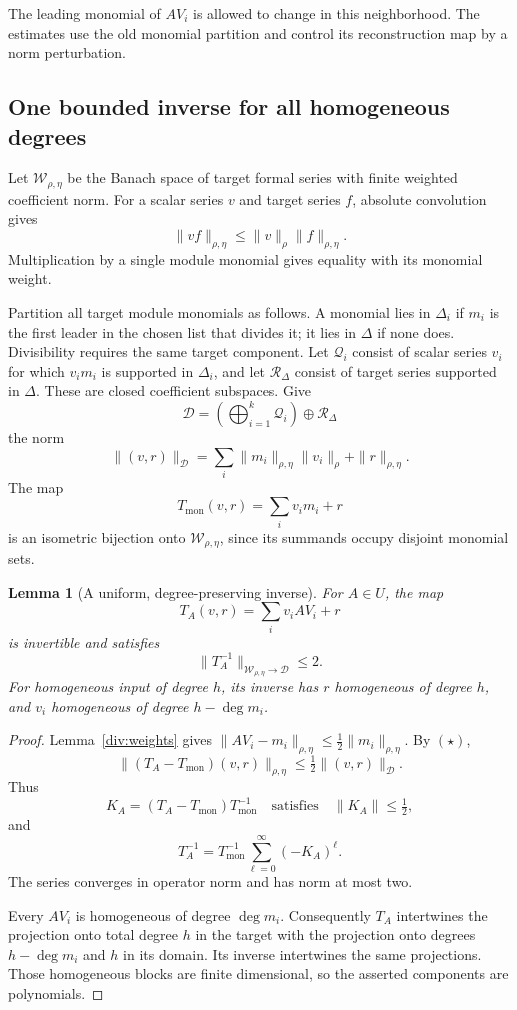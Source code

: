 \documentclass[11pt,reqno]{amsart}
\numberwithin{equation}{section}
\newtheorem{lemma}[theorem]{Lemma}
\theoremstyle{definition}
\theoremstyle{remark}
\begin{document}
The leading monomial of \(AV_i\) is allowed to change in this
neighborhood. The estimates use the old monomial partition and
control its reconstruction map by a norm perturbation.

\subsection{One bounded inverse for all homogeneous degrees}

Let \(\mathcal W_{\rho,\eta}\) be the Banach space of target formal
series with finite weighted coefficient norm. For a scalar series
\(v\) and target series \(f\), absolute convolution gives
\[
 \|vf\|_{\rho,\eta}\leq\|v\|_\rho\|f\|_{\rho,\eta}.
 \tag{\(\star\)}
\]
Multiplication by a single module monomial gives equality with its
monomial weight.

Partition all target module monomials as follows. A monomial lies
in \(\Delta_i\) if \(m_i\) is the first leader in the chosen list
that divides it; it lies in \(\Delta\) if none does. Divisibility
requires the same target component. Let \(\mathcal Q_i\) consist of
scalar series \(v_i\) for which \(v_im_i\) is supported in
\(\Delta_i\), and let \(\mathcal R_\Delta\) consist of target series
supported in \(\Delta\). These are closed coefficient subspaces.
Give
\[
 \mathcal D=
 \left(\bigoplus_{i=1}^k\mathcal Q_i\right)\oplus\mathcal R_\Delta
\]
the norm
\[
 \|(v,r)\|_{\mathcal D}
 =
 \sum_i\|m_i\|_{\rho,\eta}\|v_i\|_\rho+\|r\|_{\rho,\eta}.
\]
The map
\[
 T_{\mathrm{mon}}(v,r)=\sum_i v_im_i+r
\]
is an isometric bijection onto \(\mathcal W_{\rho,\eta}\), since
its summands occupy disjoint monomial sets.

\begin{lemma}[A uniform, degree-preserving inverse]
\label{div:neumann}
For \(A\in U\), the map
\[
 T_A(v,r)=\sum_i v_iAV_i+r
\]
is invertible and satisfies
\[
 \|T_A^{-1}\|_{\mathcal W_{\rho,\eta}\to\mathcal D}\leq2.
 \]
For homogeneous input of degree \(h\), its inverse has \(r\)
homogeneous of degree \(h\), and \(v_i\) homogeneous of degree
\(h-\deg m_i\).
\end{lemma}

\begin{proof}
Lemma~\ref{div:weights} gives
\(\|AV_i-m_i\|_{\rho,\eta}\leq\frac12\|m_i\|_{\rho,\eta}\).
By \((\star)\),
\[
 \|(T_A-T_{\mathrm{mon}})(v,r)\|_{\rho,\eta}
 \leq\tfrac12\|(v,r)\|_{\mathcal D}.
\]
Thus
\[
 K_A=(T_A-T_{\mathrm{mon}})T_{\mathrm{mon}}^{-1}
 \quad\text{satisfies}\quad \|K_A\|\leq\tfrac12,
\]
and
\[
 T_A^{-1}
 =
 T_{\mathrm{mon}}^{-1}\sum_{\ell=0}^{\infty}(-K_A)^\ell.
\]
The series converges in operator norm and has norm at most two.

Every \(AV_i\) is homogeneous of degree \(\deg m_i\).
Consequently \(T_A\) intertwines the projection onto total degree
\(h\) in the target with the projection onto degrees
\(h-\deg m_i\) and \(h\) in its domain. Its inverse intertwines the
same projections. Those homogeneous blocks are finite dimensional,
so the asserted components are polynomials.
\end{proof}
\end{document}
